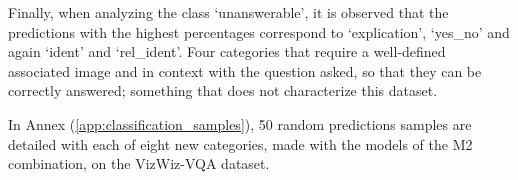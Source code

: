 
Finally, when analyzing the class `unanswerable', it is observed that the predictions with the highest percentages correspond to `explication', `yes\_no' and again `ident' and `rel\_ident'. Four categories that require a well-defined associated image and in context with the question asked, so that they can be correctly answered; something that does not characterize this dataset.

In Annex (\ref{app:classification_samples}), 50 random predictions samples are detailed with each of eight new categories, made with the models of the M2 combination, on the VizWiz-VQA dataset.